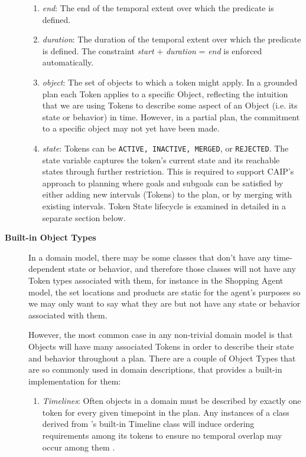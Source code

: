 \begin{description}
\begin{enumerate}
  \item \textit {end}: The end of the temporal extent over which the
    predicate is defined.

  \item \textit {duration}: The duration of the temporal extent over
    which the predicate is defined. The constraint \textit{start} $+$
    \textit{duration} = \textit{end} is enforced automatically.

  \item \textit{object}: The set of objects to which a token might
    apply. In a grounded plan each Token applies to a specific Object,
    reflecting the intuition that we are using Tokens to describe some
    aspect of an Object (i.e. its state or behavior) in time. However,
    in a partial plan, the commitment to a specific object may not yet
    have been made.

  \item \textit{state}: Tokens can be \texttt{ACTIVE, INACTIVE,
      MERGED}, or \texttt{REJECTED}. The state variable captures the
    token's current state and its reachable states through further
    restriction.  This is required to support CAIP's approach to
    planning where goals and subgoals can be satisfied by either
    adding new intervals (Tokens) to the plan, or by merging with
    existing intervals. Token State lifecycle is examined in detailed
    in a separate section below.

  \end{enumerate}

\item[\textbf{Built-in Object Types}] In a domain model, there may be
  some classes that don't have any time-dependent state or behavior,
  and therefore those classes will not have any Token types associated
  with them, for instance in the Shopping Agent model, the set
  locations and products are static for the agent's purposes so we may
  only want to say what they are but not have any state or behavior
  associated with them.

  However, the most common case in any non-trivial domain model is
  that Objects will have many associated Tokens in order to describe
  their state and behavior throughout a plan. There are a couple of
  Object Types that are so commonly used in domain descriptions, that
  \eu provides a built-in implementation for them:

\begin{enumerate}

\item \textit{Timelines}: Often objects in a domain must be described
  by exactly one token for every given timepoint in the plan. Any
  instances of a class derived from \eu's built-in Timeline class will
  induce ordering requirements among its tokens to ensure no temporal
  overlap may occur among them \cite{mus94}.  


\end{enumerate}
\end{description}
